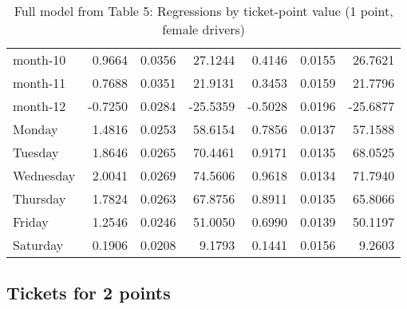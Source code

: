 \documentclass[10pt]{article}
\begin{document}
\begin{table}[ht]
\begin{tabular}{lrrrrrr}
  month-10 & 0.9664 & 0.0356 & 27.1244 & 0.4146 & 0.0155 & 26.7621 \\ 
  month-11 & 0.7688 & 0.0351 & 21.9131 & 0.3453 & 0.0159 & 21.7796 \\ 
  month-12 & -0.7250 & 0.0284 & -25.5359 & -0.5028 & 0.0196 & -25.6877 \\ 
  Monday & 1.4816 & 0.0253 & 58.6154 & 0.7856 & 0.0137 & 57.1588 \\ 
  Tuesday & 1.8646 & 0.0265 & 70.4461 & 0.9171 & 0.0135 & 68.0525 \\ 
  Wednesday & 2.0041 & 0.0269 & 74.5606 & 0.9618 & 0.0134 & 71.7940 \\ 
  Thursday & 1.7824 & 0.0263 & 67.8756 & 0.8911 & 0.0135 & 65.8066 \\ 
  Friday & 1.2546 & 0.0246 & 51.0050 & 0.6990 & 0.0139 & 50.1197 \\ 
  Saturday & 0.1906 & 0.0208 & 9.1793 & 0.1441 & 0.0156 & 9.2603 \\ 
   \hline
\end{tabular}
\caption{Full model from Table 5: Regressions by ticket-point value (1 point, female drivers)} 
\label{tab_5_1_pts_no_age_F}
\end{table}


\clearpage
\pagebreak




\subsection{Tickets for 2 points}



\end{document}
